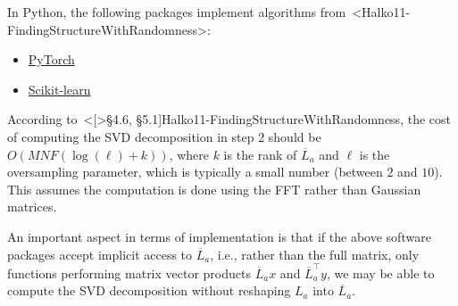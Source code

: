 \documentclass[a4paper,11pt]{article}
\def\cite#1{<#1>}%
\begin{document}
In Python, the following packages implement algorithms
from~\cite{Halko11-FindingStructureWithRandomness}:
\begin{itemize}
  \item \href{https://docs.pytorch.org/docs/stable/generated/torch.svd_lowrank.html}{PyTorch}

  \item \href{https://scikit-learn.org/stable/modules/generated/sklearn.utils.extmath.randomized_svd.html#rf38c2b656ebc-1}{Scikit-learn}
\end{itemize}
According to~\cite[\S4.6, \S5.1]{Halko11-FindingStructureWithRandomness}, the
cost of computing the SVD decomposition in step 2 should be $O(MNF(\log(\ell) +
k))$, where $k$ is the rank of $\overline{L}_a$ and $\ell$ is the oversampling parameter,
which is typically a small number (between $2$ and $10$).
This assumes the computation is done using the FFT rather than Gaussian
matrices.

\begin{Remark}
An important aspect in terms of implementation is that if the above software
packages accept implicit access to $\overline{L}_a$, i.e., rather than the full
matrix, only functions performing matrix vector products $\overline{L}_a x$ and
$\overline{L}_a ^\top y$, we may be able to compute the SVD decomposition
without reshaping $L_a$ into $\overline{L}_a$.
\end{Remark}
\end{document}
